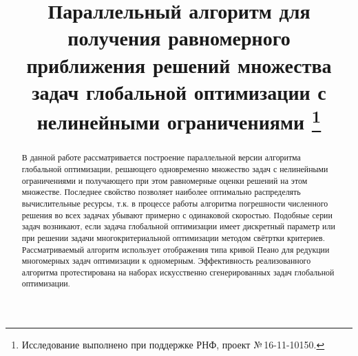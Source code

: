 \documentclass[11pt, oneside, a4paper]{article}
\begin{document}

\title{Параллельный алгоритм для получения равномерного приближения решений множества задач глобальной оптимизации с нелинейными ограничениями
\footnote{Исследование выполнено при поддержке РНФ, проект №\,16-11-10150.}}


\begin{abstract}
В данной работе рассматривается построение параллельной версии алгоритма глобальной оптимизации, решающего одновременно множество задач с нелинейными ограничениями и получающего при этом равномерные оценки решений на этом множестве. Последнее свойство позволяет наиболее оптимально распределять вычислительные ресурсы, т.к. в процессе работы алгоритма погрешности численного решения во всех задачах убывают примерно с одинаковой скоростью. Подобные серии задач возникают, если задача глобальной оптимизации имеет дискретный параметр или при решении задачи многокритериальной оптимизации методом свётртки критериев. Рассматриваемый алгоритм использует отображения типа кривой Пеано для редукции многомерных задач оптимизации к одномерным. Эффективность реализованного алгоритма протестирована на наборах искусственно сгенерированных задач глобальной оптимизации.
\end{abstract}


\end{document}
